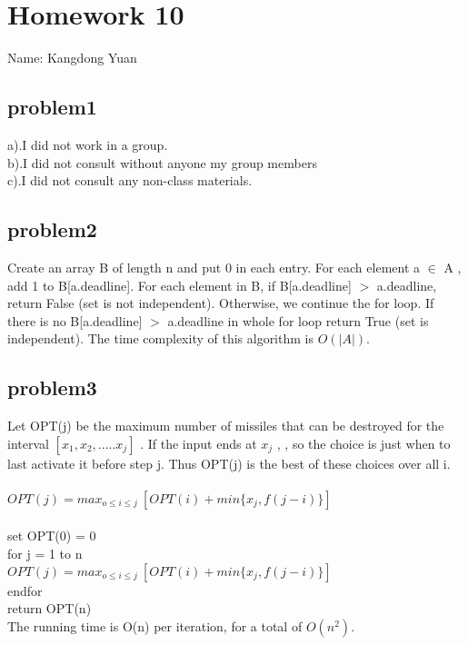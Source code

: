 \documentclass[11pt]{article}
\newcommand\tab[1][1cm]{\hspace*{#1}}
\begin{document}
\section{Homework 10}
Name: Kangdong Yuan
	
\subsection{problem1}
a).I did not work in a group.
\\b).I did not consult without anyone my group members
\\c).I did not consult any non-class materials.

\subsection{problem2}
Create an array B of length n and put 0 in each entry. For each element a $\in$ A , add 1 to B[a.deadline]. For each element in B, if B[a.deadline] $>$ a.deadline, return False (set is not independent). Otherwise, we continue the for loop. If there is no B[a.deadline] $>$ a.deadline in whole for loop return True (set is independent). The time complexity of this algorithm is $O(|A|)$.


\subsection{problem3}
Let OPT(j) be the maximum number of missiles that can be destroyed for the interval $[x_1,x_2,.....x_j]$ . If the input ends at $x_j$ , , so the choice is just when to last activate it before step j. Thus OPT(j) is the best of these
choices over all i.\\
\\
$OPT(j)=max_{o\leq i \leq j} \ [OPT(i)+min\{x_j, f(j-i)\}]$ \\
\\
set OPT(0) = 0 \\
for j = 1 to n \\
\tab $OPT(j)=max_{o\leq i \leq j} \ [OPT(i)+min\{x_j, f(j-i)\}]$\\
endfor\\
return OPT(n)\\
The running time is O(n) per iteration, for a total of $O(n^2)$.\\
\\
\end{document}
